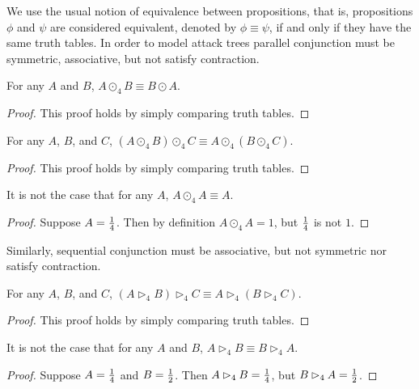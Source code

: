 We use the usual notion of equivalence between propositions, that is,
propositions $\phi$ and $\psi$ are considered equivalent, denoted by
$\phi \equiv \psi$, if and only if they have the same truth tables. In
order to model attack trees parallel conjunction must be symmetric,
associative, but not satisfy contraction.
\begin{lemma}
  \label{lemma:parallel_conjunction_is_symmetric}
  For any $A$ and $B$, $A \odot_4 B \equiv B \odot A$.
\end{lemma}
\begin{proof}
  This proof holds by simply comparing truth tables.
\end{proof}

\begin{lemma}
  \label{lemma:parallel_conjunction_is_associative}
  For any $A$, $B$, and $C$, $(A \odot_4 B) \odot_4 C \equiv A \odot_4 (B \odot_4 C)$.
\end{lemma}
\begin{proof}
  This proof holds by simply comparing truth tables.
\end{proof}

\begin{lemma}
  \label{lemma:parallel_conjunction_is_not_contractive}
  It is not the case that for any $A$, $A \odot_4 A \equiv A$.
\end{lemma}
\begin{proof}
  Suppose $A = \frac{1}{4}$.  Then by definition $A \odot_4 A = 1$, but
  $\frac{1}{4}$ is not $1$.
\end{proof}
Similarly, sequential conjunction must be associative, but not
symmetric nor satisfy contraction.
\begin{lemma}
  \label{lemma:sequential_conjunction_is_associative}
  For any $A$, $B$, and $C$, $(A \rhd_4 B) \rhd_4 C \equiv A \rhd_4 (B \rhd_4 C)$.
\end{lemma}
\begin{proof}
  This proof holds by simply comparing truth tables.
\end{proof}

\begin{lemma}
  \label{lemma:sequential_conjunction_is_symmetric}
  It is not the case that for any $A$ and $B$, $A \rhd_4 B \equiv B \rhd_4 A$.
\end{lemma}
\begin{proof}
  Suppose $A = \frac{1}{4}$ and $B = \frac{1}{2}$.  Then $A \rhd_4 B = \frac{1}{4}$,
  but $B \rhd_4 A = \frac{1}{2}$.
\end{proof}

